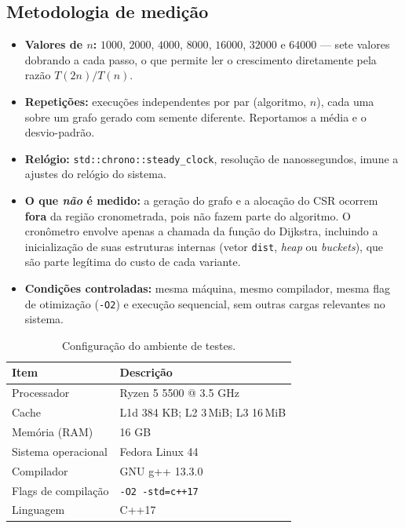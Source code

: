 \documentclass[12pt,a4paper]{article}
\begin{document}
\subsection{Metodologia de medição}

\begin{itemize}
  \item \textbf{Valores de $n$:} $1000$, $2000$, $4000$, $8000$, $16000$,
        $32000$ e $64000$ --- sete valores dobrando a cada passo, o que
        permite ler o crescimento diretamente pela razão $T(2n)/T(n)$.
  \item \textbf{Repetições:} \numRepeticoes{} execuções independentes por par
        (algoritmo, $n$), cada uma sobre um grafo gerado com semente
        diferente. Reportamos a média e o desvio-padrão.
  \item \textbf{Relógio:} \texttt{std::chrono::steady\_clock}, resolução de
        nanossegundos, imune a ajustes do relógio do sistema.
  \item \textbf{O que \emph{não} é medido:} a geração do grafo e a alocação
        do CSR ocorrem \textbf{fora} da região cronometrada, pois não fazem
        parte do algoritmo. O cronômetro envolve apenas a chamada da função
        do Dijkstra, incluindo a inicialização de suas estruturas internas
        (vetor \texttt{dist}, \emph{heap} ou \emph{buckets}), que são parte
        legítima do custo de cada variante.
  \item \textbf{Condições controladas:} mesma máquina, mesmo compilador,
        mesma flag de otimização (\texttt{-O2}) e execução sequencial, sem
        outras cargas relevantes no sistema.
\end{itemize}

\begin{table}[H]
\centering
\caption{Configuração do ambiente de testes.}
\label{tab:ambiente}
\small
\begin{tabular}{@{}ll@{}}
\toprule
\textbf{Item} & \textbf{Descrição} \\
\midrule
Processador & Ryzen 5 5500 @ 3.5 GHz \\
Cache & L1d 384 KB; L2 3\,MiB; L3 16\,MiB \\
Memória (RAM) & 16 GB \\
Sistema operacional & Fedora Linux 44 \\
Compilador & GNU g++ 13.3.0 \\
Flags de compilação & \texttt{-O2 -std=c++17} \\
Linguagem & C++17 \\
\bottomrule
\end{tabular}
\end{table}
\end{document}
